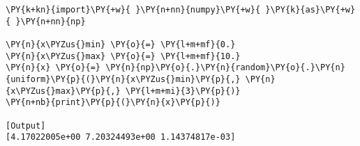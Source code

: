\begin{Verbatim}[label=\makebox{\href{https://github.com/unipi-physics-labs/lab1-notes/tree/main/snippy/np.random.uniform.py}{https://github.com/.../np.random.uniform.py}},commandchars=\\\{\}]
\PY{k+kn}{import}\PY{+w}{ }\PY{n+nn}{numpy}\PY{+w}{ }\PY{k}{as}\PY{+w}{ }\PY{n+nn}{np}

\PY{n}{x\PYZus{}min} \PY{o}{=} \PY{l+m+mf}{0.}
\PY{n}{x\PYZus{}max} \PY{o}{=} \PY{l+m+mf}{10.}
\PY{n}{x} \PY{o}{=} \PY{n}{np}\PY{o}{.}\PY{n}{random}\PY{o}{.}\PY{n}{uniform}\PY{p}{(}\PY{n}{x\PYZus{}min}\PY{p}{,} \PY{n}{x\PYZus{}max}\PY{p}{,} \PY{l+m+mi}{3}\PY{p}{)}
\PY{n+nb}{print}\PY{p}{(}\PY{n}{x}\PY{p}{)}

[Output]
[4.17022005e+00 7.20324493e+00 1.14374817e-03]
\end{Verbatim}
